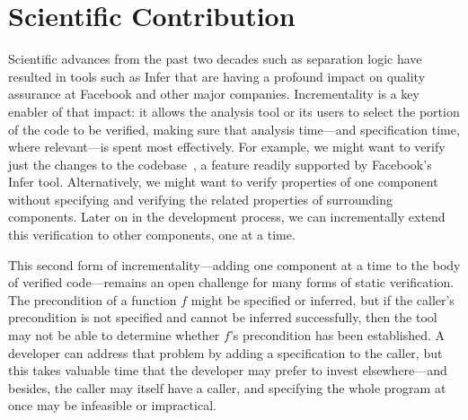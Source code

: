 \documentclass[10pt,twocolumn]{article}
\begin{document}
\begin{sloppypar}

\twocolumn[
\begin{center}
\Large
\textbf{Incremental Verification, Gradually}

\vspace{0.5cm}

\normalsize
\textbf{Jonathan Aldrich
(\href{https://dblp.uni-trier.de/pers/hd/a/Aldrich:Jonathan}{DBLP}
/\href{https://scholar.google.com/citations?user=AzHmOtcAAAAJ&hl=en}{GS}),
%
\'Eric Tanter (\href{https://dblp.uni-trier.de/pers/hd/t/Tanter:=Eacute=ric}{DBLP}/\href{https://scholar.google.com/citations?user=d0LISE4AAAAJ}{GS}), 
%
and Joshua Sunshine 
(\href{https://dblp.uni-trier.de/pers/hd/s/Sunshine:Joshua}{DBLP}
/\href{https://scholar.google.com/citations?user=V1texCUAAAAJ&hl=en&oi=ao}{GS})
}

\vspace{0.5cm}

\end{center}]

\section{Scientific Contribution}

Scientific advances from the past two decades such as separation logic have resulted in tools such as Infer that are having a profound impact on quality assurance at Facebook and other major companies.  Incrementality is a key enabler of that impact: it allows the analysis tool or its users to select the portion of the code to be verified, making sure that analysis time---and specification time, where relevant---is spent most effectively.  For example, we might want to verify just the changes to the codebase~\cite{StartupsScaleups}, a feature readily supported by Facebook's Infer tool.  Alternatively, we might want to verify properties of one component without specifying and verifying the related properties of surrounding components.  Later on in the development process, we can incrementally extend this verification to other components, one at a time.

This second form of incrementality---adding one component at a time to the body of verified code---remains an open challenge for many forms of static verification. The precondition of a function $f$ might be specified or inferred, but if the caller's precondition is not specified and cannot be inferred successfully, then the tool may not be able to determine whether $f$'s precondition has been established. A developer can address that problem by adding a specification to the caller, but this takes valuable time that the developer may prefer to invest elsewhere---and besides, the caller may itself have a caller, and specifying the whole program at once may be infeasible or impractical.


\end{sloppypar}
\end{document}
